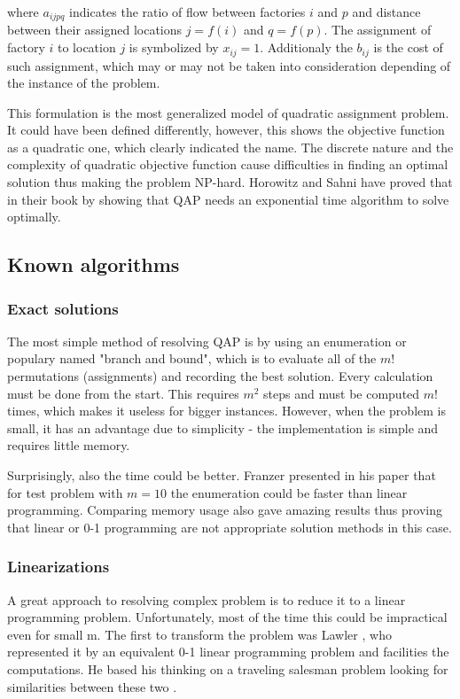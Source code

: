 where $a_{ijpq}$ indicates the ratio of flow between factories $i$ and $p$ and distance between their assigned locations $j = f(i)$ and $q = f(p)$.
The assignment of factory $i$ to location $j$ is symbolized by $x_{ij} = 1$.
Additionaly the $b_{ij}$ is the cost of such assignment, which may or may not be taken into consideration depending of the instance of the problem.

This formulation is the most generalized model of quadratic assignment problem.
It could have been defined differently, however, this shows the objective function as a quadratic one, which clearly indicated the name.
The discrete nature and the complexity of quadratic objective function cause difficulties in finding an optimal solution thus making the problem NP-hard.
Horowitz and Sahni have proved that in their book \cite{horowitz1978fundamentals} by showing that QAP needs an exponential time algorithm to solve optimally.


\subsection{Known algorithms}
\subsubsection{Exact solutions}

The most simple method of resolving QAP is by using an enumeration or populary named "branch and bound", which is to evaluate all of the $m!$ permutations (assignments) and recording the best solution.
Every calculation must be done from the start.
This requires $m^2$ steps and must be computed $m!$ times, which makes it useless for bigger instances.
However, when the problem is small, it has an advantage due to simplicity - the implementation is simple and requires little memory.

Surprisingly, also the time could be better. Franzer presented in his paper \cite{frazer1997602} that for test problem with $m=10$ the enumeration could be faster than linear programming. Comparing memory usage also gave amazing results thus proving that linear or 0-1 programming are not appropriate solution methods in this case.

\subsubsection{Linearizations}
A great approach to resolving complex problem is to reduce it to a linear programming problem.
Unfortunately, most of the time this could be impractical even for small m.
The first to transform the problem was Lawler \cite{lawler1963}, who represented it by an equivalent 0-1 linear programming problem and facilities the computations. He based his thinking on a traveling salesman problem looking for similarities between these two \cite{charnsethikul1988exact}.

